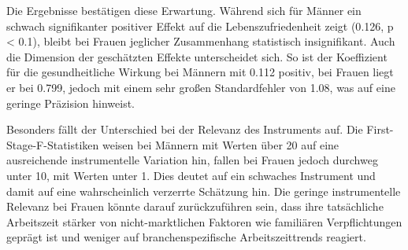 \documentclass[12pt,a4paper]{article}
\begin{document}
Die Ergebnisse bestätigen diese Erwartung. Während sich für Männer ein schwach signifikanter positiver Effekt auf die Lebenszufriedenheit zeigt (0{.}126, p < 0{.}1), bleibt bei Frauen jeglicher Zusammenhang statistisch insignifikant. Auch die Dimension der geschätzten Effekte unterscheidet sich. So ist der Koeffizient für die gesundheitliche Wirkung bei Männern mit 0{.}112 positiv, bei Frauen liegt er bei 0{.}799, jedoch mit einem sehr großen Standardfehler von 1{.}08, was auf eine geringe Präzision hinweist. 

Besonders fällt der Unterschied bei der Relevanz des Instruments auf. Die First-Stage-F-Statistiken weisen bei Männern mit Werten über 20 auf eine ausreichende instrumentelle Variation hin, fallen bei Frauen jedoch durchweg unter 10, mit Werten unter 1. Dies deutet auf ein schwaches Instrument und damit auf eine wahrscheinlich verzerrte Schätzung hin. Die geringe instrumentelle Relevanz bei Frauen könnte darauf zurückzuführen sein, dass ihre tatsächliche Arbeitszeit stärker von nicht-marktlichen Faktoren wie familiären Verpflichtungen geprägt ist und weniger auf branchenspezifische Arbeitszeittrends reagiert.
\end{document}

